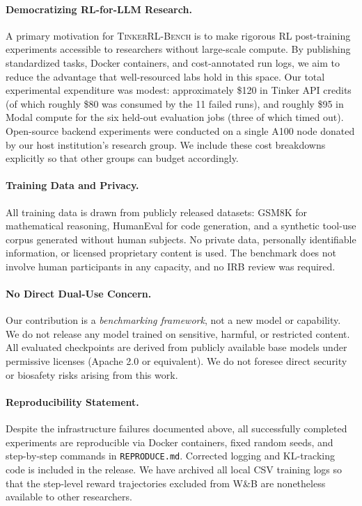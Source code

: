 \documentclass{article}
\newcommand{\ours}{\textsc{TinkerRL-Bench}}
\begin{document}
\paragraph{Democratizing RL-for-LLM Research.}
A primary motivation for \ours{} is to make rigorous RL post-training
experiments accessible to researchers without large-scale compute. By
publishing standardized tasks, Docker containers, and cost-annotated run
logs, we aim to reduce the advantage that well-resourced labs hold in this
space. Our total experimental expenditure was modest: approximately \$120 in
Tinker API credits (of which roughly \$80 was consumed by the 11 failed runs),
and roughly \$95 in Modal compute for the six held-out evaluation jobs
(three of which timed out). Open-source backend experiments were conducted on
a single A100 node donated by our host institution's research group. We include
these cost breakdowns explicitly so that other groups can budget accordingly.

\paragraph{Training Data and Privacy.}
All training data is drawn from publicly released datasets: GSM8K
\citep{cobbe2021training} for mathematical reasoning, HumanEval
\citep{chen2021codex} for code generation, and a synthetic tool-use corpus
generated without human subjects. No private data, personally identifiable
information, or licensed proprietary content is used. The benchmark does not
involve human participants in any capacity, and no IRB review was required.

\paragraph{No Direct Dual-Use Concern.}
Our contribution is a \emph{benchmarking framework}, not a new model or
capability. We do not release any model trained on sensitive, harmful, or
restricted content. All evaluated checkpoints are derived from publicly
available base models under permissive licenses (Apache 2.0 or equivalent).
We do not foresee direct security or biosafety risks arising from this work.

\paragraph{Reproducibility Statement.}
Despite the infrastructure failures documented above, all successfully
completed experiments are reproducible via Docker containers, fixed random
seeds, and step-by-step commands in \texttt{REPRODUCE.md}. Corrected logging
and KL-tracking code is included in the release. We have archived all local
CSV training logs so that the step-level reward trajectories excluded from
W\&B are nonetheless available to other researchers.
\end{document}
